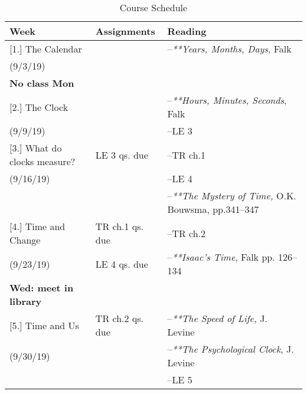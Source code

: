 \documentclass[article,oneside]{memoir}
\begin{document}
\begin{center}
\begin{longtable}{p{4.5cm}p{2.5cm}p{5cm}}
 
  \caption{Course Schedule} \\
  \toprule
  \textbf{Week} &\textbf{Assignments} & \textbf{Reading} \\
  \midrule



[1.] The Calendar		& 	& --\emph{**Years, Months, Days}, Falk \\
(9/3/19)			        	& 	&   \\
\textbf{No class Mon}	& 	&	\\[1.8\baselineskip]


[2.] The Clock   	&   	  	&  	--\emph{**Hours, Minutes, Seconds}, Falk  \\
(9/9/19)		 &		&   --LE 3 \\ [1.8\baselineskip]



[3.] What do clocks measure?	& LE 3 qs. due	& --TR ch.1\\
(9/16/19)				        	& 			& --LE 4\\ 
				        		& 			& --\emph{**The Mystery of Time,} O.K. Bouwsma, pp.341--347 \\ [1.8\baselineskip]

[4.] Time and Change	 	&   TR ch.1 qs. due	& --TR ch.2\\
(9/23/19)				  	 &  LE 4 qs. due	& --\emph{**Isaac's Time}, Falk pp. 126--134 \\ 
\textbf{Wed: meet in library}	 &  				& \\  [1.8\baselineskip]

[5.] Time and Us	&  TR ch.2 qs. due 	& --\emph{**The Speed of Life,} J. Levine \\
(9/30/19)			& 				& --\emph{**The Psychological Clock}, J. Levine \\ 
				& 				& --LE 5 \\ [1.8\baselineskip]





\end{longtable}
\end{center}
\end{document}
